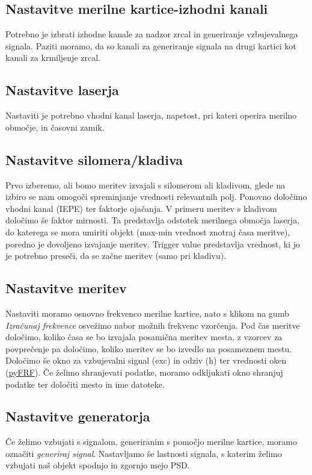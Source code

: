 \subsection{Nastavitve merilne kartice-izhodni kanali}
Potrebno je izbrati izhodne kanale za nadzor zrcal in generiranje vzbujevalnega signala. Paziti moramo, da so kanali za generiranje signala na drugi kartici kot kanali za krmiljenje zrcal.
\subsection{Nastavitve laserja}
Nastaviti je potrebno vhodni kanal laserja, napetost, pri kateri operira merilno območje, in časovni zamik.
\subsection{Nastavitve silomera/kladiva}
Prvo izberemo, ali bomo meritev izvajali s silomerom ali kladivom, glede na izbiro se nam omogoči spreminjanje vrednosti relevantnih polj. Ponovno določimo vhodni kanal (IEPE) ter faktorje ojačanja. V primeru meritev s kladivom določimo še faktor mirnosti. Ta predstavlja odstotek merilnega območja laserja, do katerega se mora umiriti objekt (max-min vrednost znotraj časa meritve), poredno je dovoljeno izvajanje meritev. Trigger value predstavlja vrednost, ki jo je potrebno preseči, da se začne meritev (samo pri kladivu).
\subsection{Nastavitve meritev}
Nastaviti moramo osnovno frekvenco merilne kartice, nato s klikom na gumb \textit{Izračunaj frekvence} osvežimo nabor možnih frekvenc vzorčenja.
Pod čas meritve določimo, koliko časa se bo izvajala posamična meritev mesta, z vzorcev za povprečenje pa določimo, koliko meritev se bo izvedlo na posameznem mestu. Določimo še okno za vzbujevalni signal (exc) in odziv (h) ter vrednosti oken (\href{https://github.com/openmodal/pyFRF/blob/master/pyFRF.py}{pyFRF}). Če želimo shranjevati podatke, moramo odkljukati okno shranjuj podatke ter določiti mesto in ime datoteke.
\subsection{Nastavitve generatorja}
Če želimo vzbujati s signalom, generiranim s pomočjo merilne kartice, moramo označiti \textit{generiraj signal}. Nastavljamo še lastnosti signala, s katerim želimo vzbujati naš objekt spodnjo in zgornjo mejo PSD. 


